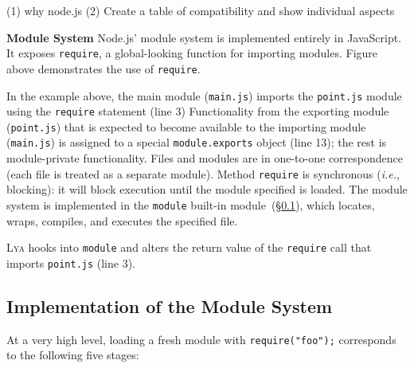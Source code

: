 \documentclass[letterpaper,twocolumn,10pt]{article}
\def\ie{{\em i.e.}, }
\newcommand{\heading}[1]{\vspace{2pt}\noindent\textbf{#1}\enspace}
\newcommand{\ttt}[1]{\texttt{#1}}
\newcommand{\sx}[1]{(\S\ref{#1})}
\newcommand{\sys}{{\scshape Lya}\xspace}
\newcommand{\fixme}[1]{{\color{red}#1}}
\begin{document}
(1) why node.js
(2) Create a table of compatibility and show individual aspects

\heading{Module System}
Node.js' module system is implemented entirely in JavaScript.
It exposes \ttt{require}, a global-looking function for importing modules.
\fixme{Figure} above demonstrates the use of \ttt{require}.

% 

In the example above, the main module (\ttt{main.js}) imports the \ttt{point.js} module using the \ttt{require} statement (line 3)
Functionality from the exporting module (\ttt{point.js}) that is expected to become available to the importing module (\ttt{main.js}) is assigned to a special \ttt{module.exports} object (line 13);
  the rest is module-private functionality.
Files and modules are in one-to-one correspondence (each file is treated as a separate module).
Method \ttt{require} is synchronous (\ie blocking):
  it will block execution until the module specified is loaded.
The module system is implemented in the \ttt{module} built-in module~\sx{c}, which locates, wraps, compiles, and executes the specified file.

\sys hooks into \ttt{module} and alters the return value of the \ttt{require} call that imports \ttt{point.js} (line 3).

\subsection{Implementation of the Module System}
\label{c}

At a very high level, loading a fresh module with \ttt{require("foo");} corresponds to the following five stages:
\end{document}
